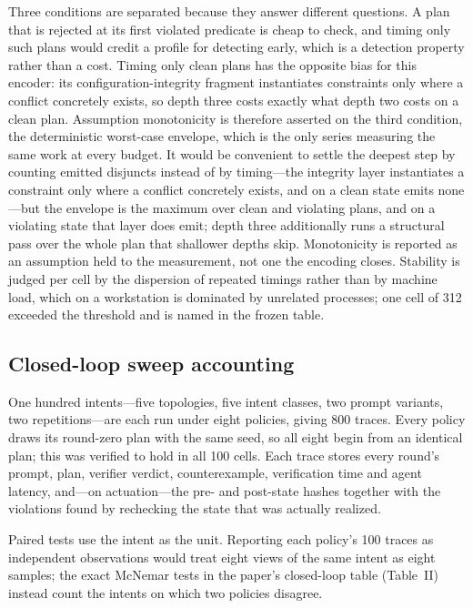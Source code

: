 Three conditions are separated because they answer different questions. A
plan that is rejected at its first violated predicate is cheap to check, and
timing only such plans would credit a profile for detecting early, which is
a detection property rather than a cost. Timing only clean plans has the
opposite bias for this encoder: its configuration-integrity fragment
instantiates constraints only where a conflict concretely exists, so depth
three costs exactly what depth two costs on a clean plan. Assumption
monotonicity is therefore asserted on the third condition, the deterministic
worst-case envelope, which is the only series measuring the same work at
every budget. It would be convenient to settle the deepest step by counting
emitted disjuncts instead of by timing---the integrity layer instantiates a
constraint only where a conflict concretely exists, and on a clean state
emits none---but the envelope is the maximum over clean and violating plans,
and on a violating state that layer does emit; depth three additionally runs
a structural pass over the whole plan that shallower depths skip.
Monotonicity is reported as an assumption held to the measurement, not one
the encoding closes.
Stability is judged per cell by the dispersion of repeated timings rather
than by machine load, which on a workstation is dominated by unrelated
processes; one cell of 312 exceeded the threshold and is named in the frozen
table.

\subsection{Closed-loop sweep accounting}

One hundred intents---five topologies, five intent classes, two prompt
variants, two repetitions---are each run under eight policies, giving 800
traces. Every policy draws its round-zero plan with the same seed, so all
eight begin from an identical plan; this was verified to hold in all 100
cells. Each trace stores every round's prompt, plan, verifier verdict,
counterexample, verification time and agent latency, and---on actuation---the
pre- and post-state hashes together with the violations found by rechecking
the state that was actually realized.

Paired tests use the intent as the unit. Reporting each policy's 100 traces
as independent observations would treat eight views of the same intent as
eight samples; the exact McNemar tests in the paper's closed-loop table
(Table~II) instead
count the intents on which two policies disagree.

